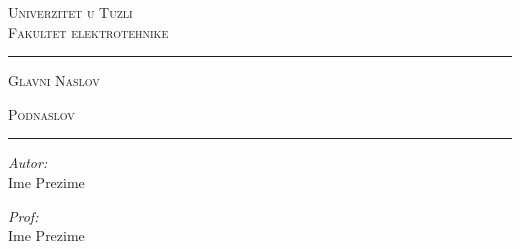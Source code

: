 \documentclass[12pt,a4paper]{report}
\newcommand\myhlinewotikz{\noindent\rule[.35em]{0.95\linewidth}{.4pt}\par}
\begin{document}
\begin{titlepage}
\center

\begin{flushleft} \large
\textsc{\Large{Univerzitet u Tuzli\\Fakultet elektrotehnike}}
\end{flushleft}

\myhlinewotikz
\textsc{\LARGE{Glavni Naslov}}\par
\vspace{3mm}
\textsc{\LARGE{Podnaslov}}\par
\myhlinewotikz

\noindent
\begin{minipage}{0.5\textwidth}
\begin{flushleft} \large
\emph{Autor:}\\
Ime Prezime
\end{flushleft}
\end{minipage}%
\begin{minipage}{0.5\textwidth}
\begin{flushright} \large
\emph{Prof:} \\
Ime Prezime
\end{flushright}
\end{minipage}

\end{titlepage}

\lipsum[3-100]
\label{LastPage}
\end{document}
